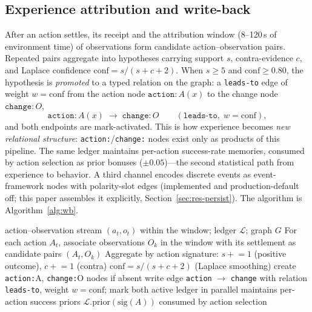 \documentclass[10pt,a4paper]{article}
\begin{document}
\subsection{Experience attribution and write-back}
\label{sec:arch-wb}
After an action settles, its receipt and the attribution window (8--120\,s of environment time) of observations form candidate action--observation pairs. Repeated pairs aggregate into hypotheses carrying support $s$, contra-evidence $c$, and Laplace confidence $\mathrm{conf}=s/(s+c+2)$. When $s\ge 5$ and $\mathrm{conf}\ge 0.80$, the hypothesis is \emph{promoted} to a typed relation on the graph: a \texttt{leads-to} edge of weight $w=\mathrm{conf}$ from the action node $\mathtt{action:}A(x)$ to the change node $\mathtt{change:}O$,
\begin{equation}
\mathtt{action:}A(x) \;\longrightarrow\; \mathtt{change:}O \qquad (\texttt{leads-to},\; w{=}\mathrm{conf}),
\label{eq:wb}
\end{equation}
and both endpoints are mark-activated. This is how experience becomes \emph{new relational structure}: \texttt{action:}/\texttt{change:} nodes exist only as products of this pipeline. The same ledger maintains per-action success-rate memories, consumed by action selection as prior bonuses ($\pm0.05$)---the second statistical path from experience to behavior. A third channel encodes discrete events as event-framework nodes with polarity-slot edges (implemented and production-default off; this paper assembles it explicitly, Section~\ref{sec:res-persist}). The algorithm is Algorithm~\ref{alg:wb}.

\begin{algorithm}[t]
\caption{Attribution--write-back: experience to relational knowledge}\label{alg:wb}
\begin{algorithmic}[1]
\Require action--observation stream $(a_t,o_t)$ within the window; ledger $\mathcal{L}$; graph $G$
\State For each action $A_t$, associate observations $O_k$ in the window with its settlement as candidate pairs $(A_t,O_k)$
\State Aggregate by action signature: $s\mathrel{+}=1$ (positive outcome), $c\mathrel{+}=1$ (contra)
\State $\mathrm{conf}=s/(s+c+2)$ (Laplace smoothing)
  \State create \texttt{action:}A, \texttt{change:}O nodes if absent
  \State write edge \texttt{action} $\longrightarrow$ \texttt{change} with relation \texttt{leads-to}, weight $w{=}\mathrm{conf}$; mark both active
\EndIf
\State ledger in parallel maintains per-action success priors $\mathcal{L}.\mathrm{prior}(\mathrm{sig}(A))$ consumed by action selection
\end{algorithmic}
\end{algorithm}
\end{document}
